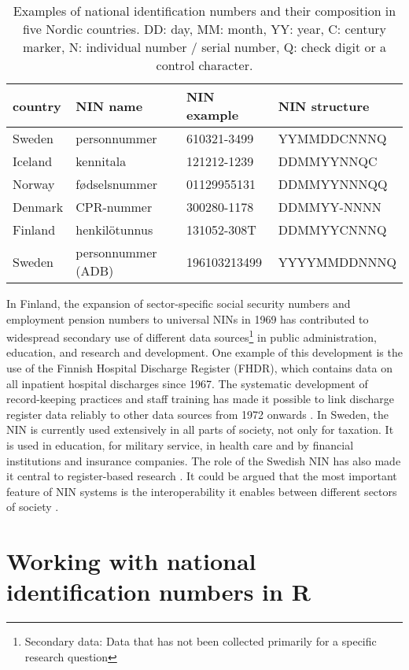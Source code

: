 \begin{table}[ht]
\centering
\begin{tabular}{llll}
\toprule
  country & NIN name & NIN example & NIN structure \\
  \hline
  Sweden & personnummer & 610321-3499 & YYMMDDCNNNQ \\
  Iceland & kennitala & 121212-1239 & DDMMYYNNQC \\
  Norway & fødselsnummer & 01129955131 & DDMMYYNNNQQ \\
  Denmark & CPR-nummer & 300280-1178 & DDMMYY-NNNN \\
  Finland & henkilötunnus & 131052-308T & DDMMYYCNNNQ \\
  \hline
  Sweden & personnummer (ADB) & 196103213499 & YYYYMMDDNNNQ \\
\bottomrule
\end{tabular}
\caption{Examples of national identification numbers and their composition in five Nordic countries. DD: day, MM: month, YY: year, C: century marker, N: individual number / serial number, Q: check digit or a control character.}
\label{tab:nordiccomparison2}
\end{table}

In Finland, the expansion of sector-specific social security numbers and employment pension numbers to universal NINs in 1969 has contributed to widespread secondary use of different data sources\footnote{Secondary data: Data that has not been collected primarily for a specific research question} in public administration, education, and research and development. One example of this development is the use of the Finnish Hospital Discharge Register (FHDR), which contains data on all inpatient hospital discharges since 1967. The systematic development of record-keeping practices and staff training has made it possible to link discharge register data reliably to other data sources from 1972 onwards \citep{sund2012}. In Sweden, the NIN is currently used extensively in all parts of society, not only for taxation. It is used in education, for military service, in health care and by financial institutions and insurance companies. The role of the Swedish NIN has also made it central to register-based research \citep{scb2016}. It could be argued that the most important feature of NIN systems is the interoperability it enables between different sectors of society \citep{alastalo2022}.

\section{Working with national identification numbers in R}

